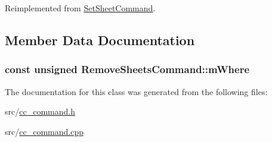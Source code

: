 Reimplemented from \hyperlink{a00134_a027700275d409b94185dfb3aa2d792bb}{Set\-Sheet\-Command}.



\subsection{Member Data Documentation}
\hypertarget{a00122_a6185d54382d4a2c77c07f918c88ea97c}{
\subsubsection[{m\-Where}]{\setlength{\rightskip}{0pt plus 5cm}const unsigned Remove\-Sheets\-Command\-::m\-Where\hspace{0.3cm}{\ttfamily [protected]}}}\label{a00122_a6185d54382d4a2c77c07f918c88ea97c}


The documentation for this class was generated from the following files\-:\begin{DoxyCompactItemize}
\item 
src/\hyperlink{a00183}{cc\-\_\-command.\-h}\item 
src/\hyperlink{a00182}{cc\-\_\-command.\-cpp}\end{DoxyCompactItemize}
